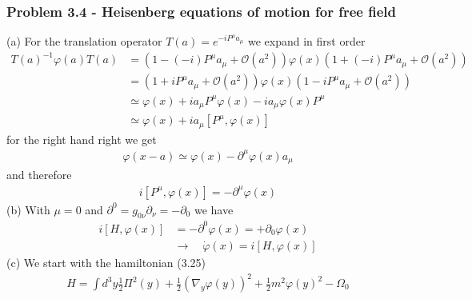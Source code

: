 \documentclass[10pt,a4paper]{article}
\theoremstyle{definition}
\begin{document}
\subsubsection{Problem 3.4 - Heisenberg equations of motion for free field}
(a) For the translation operator $T(a)=e^{-iP^\mu a_\mu}$ we expand in first order
\begin{align}
T(a)^{-1}\varphi(a)T(a)
&=\left(1-(-i)P^\mu a_\mu+\mathcal{O}(a^2)\right)\varphi(x)\left(1+(-i)P^\mu a_\mu+\mathcal{O}(a^2)\right)\\
&=\left(1+iP^\mu a_\mu+\mathcal{O}(a^2)\right)\varphi(x)\left(1-iP^\mu a_\mu+\mathcal{O}(a^2)\right)\\
&\simeq\varphi(x)+ia_\mu P^\mu\varphi(x)-ia_\mu\varphi(x)P^\mu\\
&\simeq\varphi(x)+ia_\mu [P^\mu,\varphi(x)]
\end{align}
for the right hand right we get
\begin{align}
\varphi(x-a)\simeq\varphi(x)-\partial^\mu \varphi(x)a_\mu
\end{align}
and therefore
\begin{align}
i[P^\mu,\varphi(x)]=-\partial^\mu\varphi(x)
\end{align}
(b) With $\mu=0$ and $\partial^0=g_{0\nu}\partial_\nu=-\partial_0$ we have
\begin{align}
i[H,\varphi(x)]&=-\partial^0\varphi(x)=+\partial_0\varphi(x)\\
&\rightarrow\quad\dot{\varphi}(x)=i[H,\varphi(x)]
\end{align}
(c) We start with the hamiltonian (3.25)
\begin{align}
H=\int d^3y\frac{1}{2}\Pi^2(y)+\frac{1}{2}(\nabla_y\varphi(y))^2+\frac{1}{2}m^2\varphi(y)^2-\Omega_0
\end{align}
\end{document}
